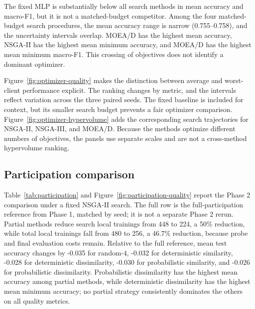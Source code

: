 \documentclass[11pt]{article}
\begin{document}
The fixed MLP is substantially below all search methods in mean accuracy and macro-F1, but it is not a matched-budget competitor. Among the four matched-budget search procedures, the mean accuracy range is narrow (0.755--0.758), and the uncertainty intervals overlap. MOEA/D has the highest mean accuracy, NSGA-II has the highest mean minimum accuracy, and MOEA/D has the highest mean minimum macro-F1. This crossing of objectives does not identify a dominant optimizer.

Figure~\ref{fig:optimizer-quality} makes the distinction between average and worst-client performance explicit. The ranking changes by metric, and the intervals reflect variation across the three paired seeds. The fixed baseline is included for context, but its smaller search budget prevents a fair optimizer comparison. Figure~\ref{fig:optimizer-hypervolume} adds the corresponding search trajectories for NSGA-II, NSGA-III, and MOEA/D. Because the methods optimize different numbers of objectives, the panels use separate scales and are not a cross-method hypervolume ranking.

\subsection{Participation comparison}

Table~\ref{tab:participation} and Figure~\ref{fig:participation-quality} report the Phase 2 comparison under a fixed NSGA-II search. The full row is the full-participation reference from Phase 1, matched by seed; it is not a separate Phase 2 rerun. Partial methods reduce search local trainings from 448 to 224, a 50\% reduction, while total local trainings fall from 480 to 256, a 46.7\% reduction, because probe and final evaluation costs remain. Relative to the full reference, mean test accuracy changes by -0.035 for random-$4$, -0.032 for deterministic similarity, -0.028 for deterministic dissimilarity, -0.030 for probabilistic similarity, and -0.026 for probabilistic dissimilarity. Probabilistic dissimilarity has the highest mean accuracy among partial methods, while deterministic dissimilarity has the highest mean minimum accuracy; no partial strategy consistently dominates the others on all quality metrics.
\end{document}
